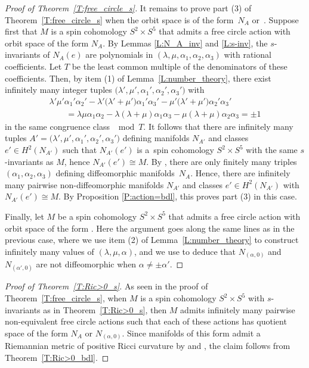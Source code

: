 \documentclass[10pt,a4paper]{amsart}
\numberwithin{equation}{section}
\theoremstyle{definition}
\numberwithin{table}{section}
\begin{document}
\begin{proof}[Proof of Theorem~\ref{T:free_circle_s}]
	It remains to prove part (3) of Theorem~\ref{T:free_circle_s} when the orbit space is of the form~$N_A$ or~. Suppose first that $M$ is a spin cohomology $S^2\times S^5$ that admits a free circle action with orbit space of the form $N_A$. By Lemmas \ref{L:N_A_inv} and \ref{L:s-inv}, the $s$-invariants of $N_A(e)$ are polynomials in $(\lambda,\mu,\alpha_1,\alpha_2,\alpha_3)$ with rational coefficients. Let $T$ be the least common multiple of the denominators of these coefficients. Then, by item (1) of Lemma~\ref{L:number_theory}, there exist infinitely many integer tuples $\bigl(\lambda',\mu',\alpha_1',\alpha_2',\alpha_3'\bigr)$ with
	\begin{gather*} \lambda'\mu'\alpha_1'\alpha_2'-\lambda'\bigl(\lambda'+\mu'\bigr)\alpha_1'\alpha_3'-\mu'\bigl(\lambda'+\mu'\bigr)\alpha_2'\alpha_3'\\
     \qquad=\lambda\mu\alpha_1\alpha_2-\lambda(\lambda+\mu)\alpha_1\alpha_3-\mu(\lambda+\mu)\alpha_2\alpha_3=\pm 1
    \end{gather*}
	in the same congruence class $\mod T$. It follows that there are infinitely many tuples $A'=\bigl(\lambda',\mu',\alpha_1',\alpha_2',\alpha_3'\bigr)$ defining manifolds $N_{A'}$ and classes $e'\in H^2(N_{A'})$ such that $N_{A'}(e')$ is a~spin cohomology $S^2\times S^5$ with the same $s$-invariants as $M$, hence $N_{A'}(e')\cong M$. By \cite[Proposition~4.12]{Re24b}, there are only finitely many triples $(\alpha_1,\alpha_2,\alpha_3)$ defining diffeomorphic manifolds~$N_A$. Hence, there are infinitely many pairwise non-diffeomorphic manifolds $N_{A'}$ and classes $e'\in H^2(N_{A'})$ with $N_{A'}(e')\cong M$. By Proposition \ref{P:action=bdl}, this proves part (3) in this case.
	
	Finally, let $M$ be a spin cohomology $S^2\times S^5$ that admits a free circle action with orbit space of the form . Here the argument goes along the same lines as in the previous case, where we use item (2) of Lemma~\ref{L:number_theory} to construct infinitely many values of $(\lambda,\mu,\alpha)$, and we use \cite[Proposition~4.12]{Re24b} to deduce that $N_{(\alpha,0)}$ and $N_{(\alpha',0)}$ are not diffeomorphic when $\alpha\neq\pm\alpha'$.
\end{proof}

\begin{proof}[Proof of Theorem~\ref{T:Ric>0_s}]
	As seen in the proof of Theorem~\ref{T:free_circle_s}, when $M$ is a spin cohomology $S^2\times S^5$ with $s$-invariants as in Theorem~\ref{T:Ric>0_s}, then $M$ admits infinitely many pairwise non-equivalent free circle actions such that each of these actions has quotient space of the form $N_A$ or $N_{(\alpha,0)}$. Since manifolds of this form admit a Riemannian metric of positive Ricci curvature by \cite[Theorem B]{Re23} and \cite[Theorem 2.7.3]{GW09}, the claim follows from Theorem~\ref{T:Ric>0_bdl}.
\end{proof}
\end{document}
